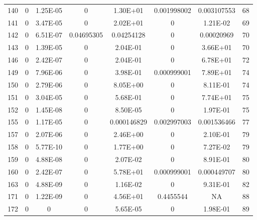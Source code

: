 {\begin{longtable}{cccccccc}
140 & {\color{red}0} & {\color{red}1.25E-05} & {\color{red}0} & 1.30E+01 & {\color{red}0.001998002} & {\color{red}0.003107553} & 68 \\
141 & {\color{red}0} & {\color{red}3.47E-05} & {\color{red}0} & 2.02E+01 & {\color{red}0} & {\color{red}1.21E-02} & 69 \\
142 & {\color{red}0} & {\color{red}6.51E-07} & {\color{red}0.04695305} & {\color{red}0.04254128} & {\color{red}0} & {\color{red}0.00020969} & 70 \\
143 & {\color{red}0} & {\color{red}1.39E-05} & {\color{red}0} & 2.04E-01 & {\color{red}0} & 3.66E+01 & 70 \\
146 & {\color{red}0} & {\color{red}2.42E-07} & {\color{red}0} & 2.04E-01 & {\color{red}0} & 6.78E+01 & 72 \\
149 & {\color{red}0} & {\color{red}7.96E-06} & {\color{red}0} & 3.98E-01 & {\color{red}0.000999001} & 7.89E+01 & 74 \\
150 & {\color{red}0} & {\color{red}2.79E-06} & {\color{red}0} & 8.05E+00 & {\color{red}0} & 8.11E-01 & 74 \\
151 & {\color{red}0} & {\color{red}3.04E-05} & {\color{red}0} & 5.68E-01 & {\color{red}0} & 7.74E+01 & 75 \\
152 & {\color{red}0} & {\color{red}1.45E-08} & {\color{red}0} & {\color{red}8.50E-05} & {\color{red}0} & 1.97E-01 & 75 \\
155 & {\color{red}0} & {\color{red}1.17E-05} & {\color{red}0} & {\color{red}0.000146829} & {\color{red}0.002997003} & {\color{red}0.001536466} & 77 \\
157 & {\color{red}0} & {\color{red}2.07E-06} & {\color{red}0} & 2.46E+00 & {\color{red}0} & 2.10E-01 & 79 \\
158 & {\color{red}0} & {\color{red}5.77E-10} & {\color{red}0} & 1.77E+00 & {\color{red}0} & 7.27E-02 & 79 \\
159 & {\color{red}0} & {\color{red}4.88E-08} & {\color{red}0} & {\color{red}2.07E-02} & {\color{red}0} & 8.91E-01 & 80 \\
160 & {\color{red}0} & {\color{red}2.42E-07} & {\color{red}0} & 5.78E+01 & {\color{red}0.000999001} & {\color{red}0.000449707} & 80 \\
163 & {\color{red}0} & {\color{red}4.88E-09} & {\color{red}0} & {\color{red}1.16E-02} & {\color{red}0} & 9.31E-01 & 82 \\
171 & {\color{red}0} & {\color{red}1.22E-09} & {\color{red}0} & 4.56E+01 & 0.4455544 & NA & 88 \\
172 & {\color{red}0} & {\color{red}0} & {\color{red}0} & {\color{red}5.65E-05} & {\color{red}0} & 1.98E-01 & 89 \\

\end{longtable}}
